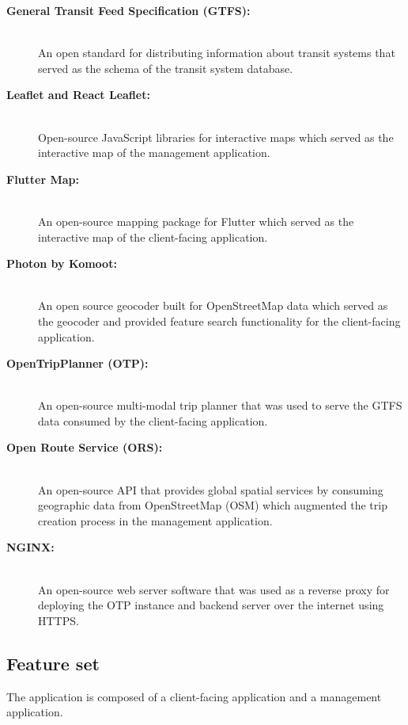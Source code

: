 \documentclass[journal]{./IEEE/IEEEtran}
\begin{document}
\begin{description}
    \item[\textbf{General Transit Feed Specification (GTFS):}] \hfill \\
        An open standard for distributing information about transit systems that served as the schema of the transit system database.
    
    \item[\textbf{Leaflet and React Leaflet:}] \hfill \\
        Open-source JavaScript libraries for interactive maps which served as the interactive map of the management application.

    \item[\textbf{Flutter Map:}] \hfill \\
        An open-source mapping package for Flutter which served as the interactive map of the client-facing application.

    \item[\textbf{Photon by Komoot:}] \hfill \\
        An open source geocoder built for OpenStreetMap data which served as the geocoder and provided feature search functionality for the client-facing application.

    \item[\textbf{OpenTripPlanner (OTP):}] \hfill \\
        An open-source multi-modal trip planner that was used to serve the GTFS data consumed by the client-facing application.

    \item[\textbf{Open Route Service (ORS):}] \hfill \\
        An open-source API that provides global spatial services by consuming geographic data from OpenStreetMap (OSM) which augmented the trip creation process in the management application.

    \item[\textbf{NGINX:}] \hfill \\
        An open-source web server software that was used as a reverse proxy for deploying the OTP instance and backend server over the internet using HTTPS.
\end{description}

\subsection{Feature set}
The application is composed of a client-facing application and a management application. \hfill \\
\end{document}
